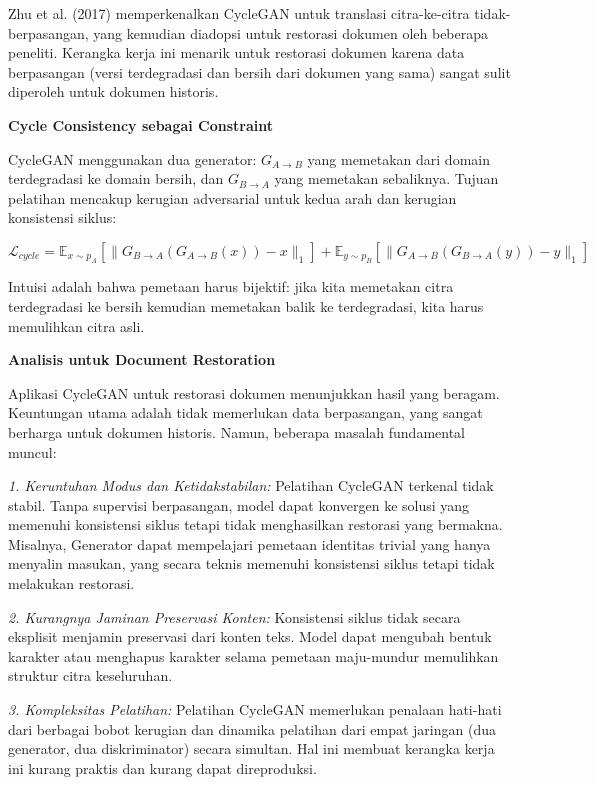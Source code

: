 \documentclass[12pt,a4paper]{article}
\begin{document}
Zhu et al. (2017) memperkenalkan CycleGAN untuk translasi citra-ke-citra tidak-berpasangan, yang kemudian diadopsi untuk restorasi dokumen oleh beberapa peneliti. Kerangka kerja ini menarik untuk restorasi dokumen karena data berpasangan (versi terdegradasi dan bersih dari dokumen yang sama) sangat sulit diperoleh untuk dokumen historis.

\textbf{Cycle Consistency sebagai Constraint}

CycleGAN menggunakan dua generator: $G_{A \to B}$ yang memetakan dari domain terdegradasi ke domain bersih, dan $G_{B \to A}$ yang memetakan sebaliknya. Tujuan pelatihan mencakup kerugian adversarial untuk kedua arah dan kerugian konsistensi siklus:

\begin{equation}
\mathcal{L}_{cycle} = \mathbb{E}_{x \sim p_A}[\|G_{B \to A}(G_{A \to B}(x)) - x\|_1] + \mathbb{E}_{y \sim p_B}[\|G_{A \to B}(G_{B \to A}(y)) - y\|_1]
\end{equation}

Intuisi adalah bahwa pemetaan harus bijektif: jika kita memetakan citra terdegradasi ke bersih kemudian memetakan balik ke terdegradasi, kita harus memulihkan citra asli.

\textbf{Analisis untuk Document Restoration}

Aplikasi CycleGAN untuk restorasi dokumen menunjukkan hasil yang beragam. Keuntungan utama adalah tidak memerlukan data berpasangan, yang sangat berharga untuk dokumen historis. Namun, beberapa masalah fundamental muncul:

\textit{1. Keruntuhan Modus dan Ketidakstabilan:} Pelatihan CycleGAN terkenal tidak stabil. Tanpa supervisi berpasangan, model dapat konvergen ke solusi yang memenuhi konsistensi siklus tetapi tidak menghasilkan restorasi yang bermakna. Misalnya, Generator dapat mempelajari pemetaan identitas trivial yang hanya menyalin masukan, yang secara teknis memenuhi konsistensi siklus tetapi tidak melakukan restorasi.

\textit{2. Kurangnya Jaminan Preservasi Konten:} Konsistensi siklus tidak secara eksplisit menjamin preservasi dari konten teks. Model dapat mengubah bentuk karakter atau menghapus karakter selama pemetaan maju-mundur memulihkan struktur citra keseluruhan.

\textit{3. Kompleksitas Pelatihan:} Pelatihan CycleGAN memerlukan penalaan hati-hati dari berbagai bobot kerugian dan dinamika pelatihan dari empat jaringan (dua generator, dua diskriminator) secara simultan. Hal ini membuat kerangka kerja ini kurang praktis dan kurang dapat direproduksi.
\end{document}

